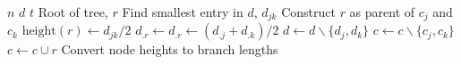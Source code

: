   \begin{algorithmic}[1]
    \REQUIRE $n$ 
    \REQUIRE $d$ 
    \REQUIRE $t$ 
    \ENSURE Root of tree, $r$
    \STATE Find smallest entry in $d$, $d_{jk}$
    \STATE Construct $r$ as parent of $c_j$ and $c_k$
    \STATE $\mbox{height}(r)\leftarrow d_{jk}/2$
    \STATE $d_{.r}\leftarrow d_{.r}\leftarrow (d_{.j}+d_{.k})/2$
    \STATE $d\leftarrow d\backslash\{d_j,d_k\}$
    \STATE $c\leftarrow c\backslash\{c_j,c_k\}$
    \STATE $c\leftarrow c\cup r$
    \ENDFOR
    \STATE Convert node heights to branch lengths
\end{algorithmic}
